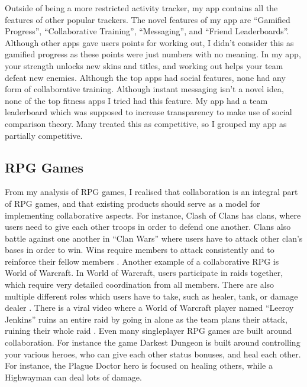 \documentclass{l4proj}
\begin{document}
Outside of being a more restricted activity tracker, my app contains all the features of other popular trackers. 
The novel features of my app are ``Gamified Progress'', ``Collaborative Training'', ``Messaging'', and ``Friend Leaderboards''. Although other apps gave users points for working out, I didn't consider this as gamified progress as these points were just numbers with no meaning. In my app, your strength unlocks new skins and titles, and working out helps your team defeat new enemies. Although the top apps had social features, none had any form of collaborative training. Although instant messaging isn't a novel idea, none of the top fitness apps I tried had this feature. My app had a team leaderboard which was supposed to increase transparency to make use of social comparison theory. Many treated this as competitive, so I grouped my app as partially competitive.




\subsection{RPG Games}
From my analysis of RPG games, I realised that collaboration is an integral part of RPG games, and that existing products should serve as a model for implementing collaborative aspects. For instance, Clash of Clans has clans, where users need to give each other troops in order to defend one another. Clans also battle against one another in ``Clan Wars'' where users have to attack other clan's bases in order to win. Wins require members to attack consistently and to reinforce their fellow members \citep{coc}. 
Another example of a collaborative RPG is World of Warcraft. In World of Warcraft, users participate in raids together, which require very detailed coordination from all members. There are also multiple different roles which users have to take, such as healer, tank, or damage dealer \citep{wow}. There is a viral video where a World of Warcraft player named ``Leeroy Jenkins'' ruins an entire raid by going in alone as the team plans their attack, ruining their whole raid \citep{leeroy_jenkins}. Even many singleplayer RPG games are built around collaboration. For instance the game Darkest Dungeon \citep{darkest_dungeon} is built around controlling your various heroes, who can give each other status bonuses, and heal each other. For instance, the Plague Doctor hero is focused on healing others, while a Highwayman can deal lots of damage. 
\end{document}
